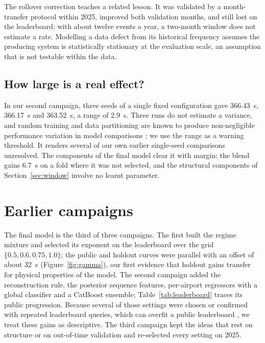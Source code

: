 \documentclass[11pt,a4paper]{article}
\begin{document}
The rollover correction teaches a related lesson. It was validated by a
month-transfer protocol within 2025, improved both validation months, and
still lost on the leaderboard: with about twelve events a year, a two-month
window does not estimate a rate. Modelling a data defect from its historical
frequency assumes the producing system is statistically stationary at the
evaluation scale, an assumption that is not testable within the data.

\subsection{How large is a real effect?}

In our second campaign, three seeds of a single fixed configuration gave
\SI{366.43}{\second}, \SI{366.17}{\second} and \SI{363.52}{\second}, a range of
\SI{2.9}{\second}. Three runs do not estimate a variance, and random training
and data partitioning are known to produce non-negligible performance
variation in model comparisons \cite{raste2022}; we use the range as a warning
threshold. It renders several of our own earlier single-seed comparisons
unresolved. The components of the final model clear it with margin: the blend
gains \SI{6.7}{\second} on a fold where it was not selected, and the
structural components of Section~\ref{sec:window} involve no learnt parameter.

\section{Earlier campaigns}
\label{sec:history}

The final model is the third of three campaigns. The first built the regime
mixture and selected its exponent on the leaderboard over the grid
\(\{0.5, 0.6, 0.75, 1.0\}\); the public and holdout curves were parallel with
an offset of about \SI{32}{\second} (Figure~\ref{fig:gamma}), our first
evidence that holdout gains transfer for physical properties of the model.
The second campaign added the reconstruction rule, the posterior sequence
features, per-airport regressors with a global classifier and a CatBoost
ensemble; Table~\ref{tab:leaderboard} traces its public progression. Because
several of those settings were chosen or confirmed with repeated leaderboard
queries, which can overfit a public leaderboard \cite{blum2015}, we treat
these gains as descriptive. The third campaign kept the ideas that rest on
structure or on out-of-time validation and re-selected every setting on 2025.
\end{document}
